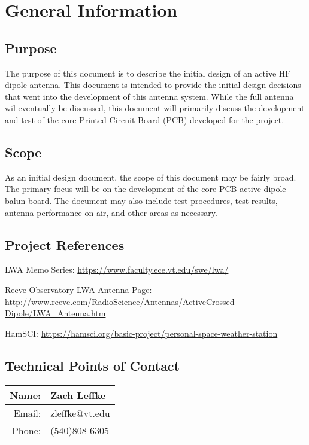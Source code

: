 \newpage
\section{General Information}
\label{sec:general_introduction}

\subsection{Purpose}
\label{subsec:purpose}
The purpose of this document is to describe the initial design of an active HF dipole antenna. This document is intended to provide the initial design decisions that went into the development of this antenna system.  While the full antenna wil eventually be discussed, this document will primarily discuss the development and test of the core Printed Circuit Board (PCB) developed for the project. 

\subsection{Scope}
\label{subsec:scope}
As an initial design document, the scope of this document may be fairly broad.  The primary focus will be on the development of the core PCB active dipole balun board.  The document may also include test procedures, test results,  antenna performance on air, and other areas as necessary.

\subsection{Project References}
\label{subsec:references}
LWA Memo Series: \url{https://www.faculty.ece.vt.edu/swe/lwa/}

\noindent Reeve Observatory LWA Antenna Page:\\ \url{http://www.reeve.com/RadioScience/Antennas/ActiveCrossed-Dipole/LWA_Antenna.htm}

\noindent HamSCI: \url{https://hamsci.org/basic-project/personal-space-weather-station}

\subsection{Technical Points of Contact}
\label{subsec:poc}
\renewcommand{\arraystretch}{1.2}
	\begin{tabular}{|r|l|}
		\hline
		Name: & Zach Leffke \\
		\hline
		Email: & zleffke@vt.edu \\
		\hline
		Phone: & (540)808-6305 \\
		\hline
	\end{tabular}
